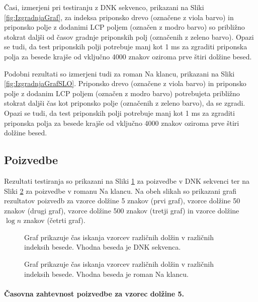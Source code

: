 Časi, izmerjeni pri testiranju z DNK sekvenco, prikazani na Sliki \ref{fig:IzgradnjaGraf}, za indeksa priponsko drevo (označene z viola barvo) in priponsko polje z dodanimi LCP poljem (označen z modro barvo) so približno stokrat daljši od časov gradnje priponskih polj (označenih z zeleno barvo). Opazi se tudi, da test priponskih polji potrebuje manj kot 1 ms za zgraditi priponska polja za besede krajše od vključno 4000 znakov oziroma prve štiri dolžine besed.

Podobni rezultati so izmerjeni tudi za roman Na klancu, prikazani na Sliki \ref{fig:IzgradnjaGrafSLO}. Priponsko drevo (označene z viola barvo) in priponsko polje z dodanim LCP poljem (označen z modro barvo) potrebujeta približno stokrat daljši čas kot priponsko polje (označenih z zeleno barvo), da se zgradi. Opazi se tudi, da test priponskih polji potrebuje manj kot 1 ms za zgraditi priponska polja za besede krajše od vključno 4000 znakov oziroma prve štiri dolžine besed.


\subsection{Poizvedbe}
Rezultati testiranja so prikazani na Sliki \ref{fig:IskanjeGraf} za poizvedbe v DNK sekvenci ter na Sliki \ref{fig:IskanjeGrafSLO} za poizvedbe v romanu Na klancu. Na obeh slikah so prikazani grafi rezultatov poizvedb za vzorce dolžine 5 znakov (prvi graf), vzorce dolžine 50 znakov (drugi graf), vzorce dolžine 500 znakov (tretji graf) in vzorce dolžine $\log{n}$ znakov (četrti graf).

\begin{figure}[htb]
    \centering
    
    \caption{Graf prikazuje čas iskanja vzorcev različnih dolžin v različnih indeksih besede. Vhodna beseda je DNK sekvenca.} 
    \label{fig:IskanjeGraf}
\end{figure}

\begin{figure}[htb]
    \centering
    
    \caption{Graf prikazuje čas iskanja vzorcev različnih dolžin v različnih indeksih besede. Vhodna beseda je roman Na klancu.} 
    \label{fig:IskanjeGrafSLO}
\end{figure}

\paragraph{Časovna zahtevnost poizvedbe za vzorec dolžine 5.}

